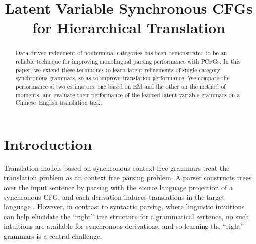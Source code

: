 \documentclass[11pt]{article}
\title{Latent Variable Synchronous CFGs for Hierarchical Translation}
\date{}
\begin{document}
\maketitle
\begin{abstract}
Data-driven refinement of nonterminal categories has been demonstrated to be an reliable technique for improving monolingual parsing performance with PCFGs. In this paper, we extend these techniques to learn latent refinements of single-category synchronous grammars, so as to improve translation performance. We compare the performance of two estimators: one based on EM and the other on the method of moments, and evaluate their performance of the learned latent variable grammars on a Chinese--English translation task.
\end{abstract}

\section{Introduction}
Translation models based on synchronous context-free grammars treat the translation problem as an context free parsing problem. A parser constructs trees over the input sentence by parsing with the source language projection of a synchronous CFG, and each derivation induces translations in the target language \cite{Chiang2007}. However, in contrast to syntactic parsing, where linguistic intuitions can help elucidate the ``right'' tree structure for a grammatical sentence, no such intuitions are available for synchronous derivations, and so learning the ``right'' grammars is a central challenge.
\end{document}
